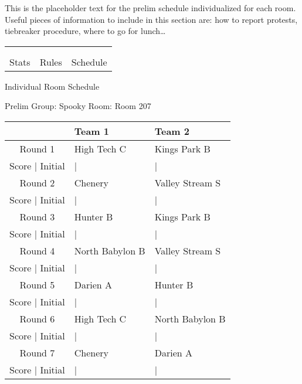\documentclass{article}%
\begin{document}
\vspace*{16pt}%
\linebreak%
This is the placeholder text for the prelim schedule individualized for each room. Useful pieces of information to include in this section are: how to report protests, tiebreaker procedure, where to go for lunch…%
\vspace*{30pt}%
\newline%
%
\begin{tabularx}{\textwidth}{YYY}%
  &  &  \\%
\\%
Stats&Rules&Schedule\\%
\end{tabularx}%
\newpage%
\begin{center}%
\begin{Huge}%
Individual Room Schedule%
\end{Huge}%
\vspace*{16pt}%
\linebreak%
\begin{Large}%
Prelim Group: Spooky \hfill Room: Room 207%
\end{Large}%
\end{center}%
%
\begin{tabularx}{\textwidth}{|c|Y|Y|}%
\hline%
&Team 1&Team 2\\%
\hline%
Round 1&High Tech C&Kings Park B\\%
\hline%
Score | Initial&|&|\\%
\hline%
Round 2&Chenery&Valley Stream S\\%
\hline%
Score | Initial&|&|\\%
\hline%
Round 3&Hunter B&Kings Park B\\%
\hline%
Score | Initial&|&|\\%
\hline%
Round 4&North Babylon B&Valley Stream S\\%
\hline%
Score | Initial&|&|\\%
\hline%
Round 5&Darien A&Hunter B\\%
\hline%
Score | Initial&|&|\\%
\hline%
Round 6&High Tech C&North Babylon B\\%
\hline%
Score | Initial&|&|\\%
\hline%
Round 7&Chenery&Darien A\\%
\hline%
Score | Initial&|&|\\%
\hline%
\end{tabularx}%
\end{document}
